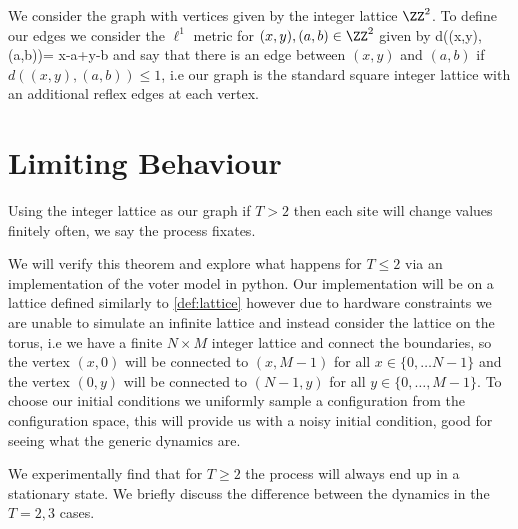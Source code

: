 \begin{defn}\label{def:lattice}
	We consider the graph with vertices given by the integer lattice \(\ZZ^2\).
	To define our edges we consider the \(\ell^1\) metric for \((x,y),(a,b)\in\ZZ^2\) given by
	\be
	d((x,y),(a,b))= \lvert x-a\rvert +\lvert y-b\rvert
	\ee
	and say that there is an edge between \((x,y)\) and \((a,b)\) if \(d((x,y),(a,b))\le  1\),
	i.e our graph is the standard square integer lattice with an additional reflex edges at each vertex.
\end{defn}


\section{Limiting Behaviour}\label{sec:limit}
\begin{thm}\label{thm:convergence}
		Using the integer lattice as our graph if \(T>2\) then each site will change values finitely often, we say the process fixates\cite{ergo}.
\end{thm}

We will verify this theorem and explore what happens for \(T\le 2\) via an implementation of the voter model in python.
Our implementation will be on a lattice defined similarly to \cref{def:lattice} however due to hardware constraints we are unable to simulate an infinite lattice and instead consider the lattice on the torus, i.e we have a finite \(N\times M\) integer lattice and connect the boundaries, so the vertex \((x,0)\) will be connected to \((x,M-1)\) for all \(x\in\{0,\dots  N-1\}\) and the vertex \((0,y)\) will be connected to \((N-1,y)\) for all \(y\in\{0,\dots, M-1\}\).
To choose our initial conditions we uniformly sample a configuration from the configuration space, this will provide us with a noisy initial condition, good for seeing what the generic dynamics are. 

We experimentally find that for \(T\ge 2\) the process will always end up in a stationary state.
We briefly discuss the difference between the dynamics in the \(T=2,3\) cases.

